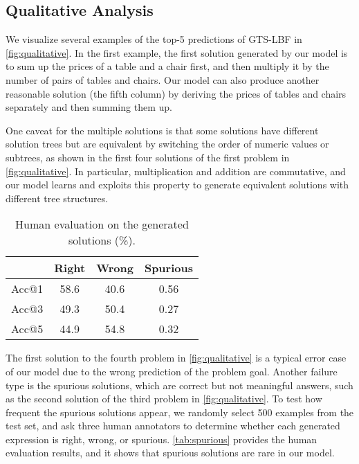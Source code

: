 \subsection{Qualitative Analysis} \label{sec_QS}
We visualize several examples of the top-5 predictions of GTS-LBF in \autoref{fig:qualitative}. In the first example, the first solution generated by our model is to sum up the prices of a table and a chair first, and then multiply it by the number of pairs of tables and chairs. Our model can also produce another reasonable solution (the fifth column) by deriving the prices of tables and chairs separately and then summing them up. 




One caveat for the multiple solutions is that some solutions have different solution trees but are equivalent by switching the order of numeric values or subtrees, as shown in the first four solutions of the first problem in \autoref{fig:qualitative}. In particular, multiplication and addition are commutative, and our model learns and exploits this property to generate equivalent solutions with different tree structures. 
\begin{table}[]
    \centering
    \small
    \begin{tabular}{c|ccc}
        \hline
         & Right & Wrong & Spurious \\
         \hline
        Acc@1 & 58.6 & 40.6 & 0.56\\
        Acc@3 & 49.3 & 50.4 & 0.27\\
        Acc@5 & 44.9 & 54.8 & 0.32\\
        \hline
    \end{tabular}
    \caption{Human evaluation on the generated solutions (\%). }
    \label{tab:spurious}
    \vspace{-5mm}
\end{table}


The first solution to the fourth problem in \autoref{fig:qualitative} is a typical error case of our model due to the wrong prediction of the problem goal. Another failure type is the spurious solutions, which are correct but not meaningful answers, such as the second solution of the third problem in \autoref{fig:qualitative}. To test how frequent the spurious solutions appear, we randomly select 500 examples from the test set, and ask three human annotators to determine whether each generated expression is right, wrong, or spurious. \autoref{tab:spurious} provides the human evaluation results, and it shows that spurious solutions are rare in our model. 


